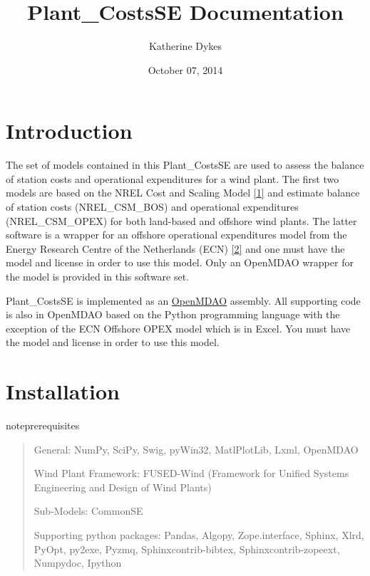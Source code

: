 \documentclass[letterpaper,10pt,openany,oneside]{sphinxmanual}
\title{Plant_CostsSE Documentation}
\date{October 07, 2014}
\author{Katherine Dykes}
\begin{document}
\maketitle
\tableofcontents
{}\label{index::doc}



\chapter{Introduction}
\label{intro:introduction}\label{intro:plant-costsse}\label{intro::doc}
The set of models contained in this Plant\_CostsSE are used to assess the balance of station costs and operational expenditures for a wind plant.  The first two models are based on the NREL Cost and Scaling Model {\hyperref[theory:fingersh2006]{{[}1{]}}} and estimate balance of station costs (NREL\_CSM\_BOS) and operational expenditures (NREL\_CSM\_OPEX) for both land-based and offshore wind plants.  The latter software is a wrapper for an offshore operational expenditures model from the Energy Research Centre of the Netherlands (ECN) {\hyperref[theory:ecn2012]{{[}2{]}}} and one must have the model and license in order to use this model.  Only an OpenMDAO wrapper for the model is provided in this software set.

Plant\_CostsSE is implemented as an \href{http://openmdao.org/}{OpenMDAO} assembly.  All supporting code is also in OpenMDAO based on the Python programming language with the exception of the ECN Offshore OPEX model which is in Excel.  You must have the model and license in order to use this model.


\chapter{Installation}
\label{installation:installation}\label{installation::doc}
\begin{notice}{note}{prerequisites}
\begin{quote}

General: NumPy, SciPy, Swig, pyWin32, MatlPlotLib, Lxml, OpenMDAO

Wind Plant Framework: FUSED-Wind (Framework for Unified Systems Engineering and Design of Wind Plants)

Sub-Models: CommonSE

Supporting python packages: Pandas, Algopy, Zope.interface, Sphinx, Xlrd, PyOpt, py2exe, Pyzmq, Sphinxcontrib-bibtex, Sphinxcontrib-zopeext, Numpydoc, Ipython
\end{quote}
\end{notice}
\end{document}
